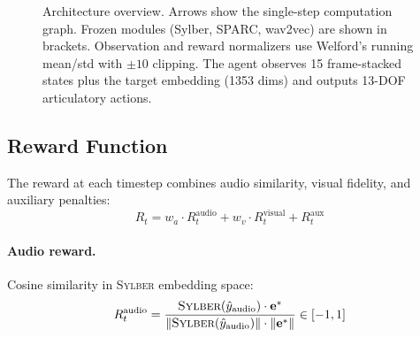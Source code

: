 \documentclass[11pt, a4paper]{article}
\newcommand{\sylber}{\textsc{Sylber}}
\begin{document}
\begin{figure}[t]
\centering
{}
\caption{Architecture overview. Arrows show the single-step computation graph. Frozen modules (Sylber, SPARC, wav2vec) are shown in brackets. Observation and reward normalizers use Welford's running mean/std with $\pm 10$ clipping. The agent observes 15 frame-stacked states plus the target embedding (1353 dims) and outputs 13-DOF articulatory actions.}
\label{fig:architecture}
\end{figure}

\subsection{Reward Function}
\label{sec:reward}

The reward at each timestep combines audio similarity, visual fidelity, and auxiliary penalties:
\begin{equation}
    R_t = w_a \cdot R^{\text{audio}}_t + w_v \cdot R^{\text{visual}}_t + R^{\text{aux}}_t
    \label{eq:reward}
\end{equation}

\paragraph{Audio reward.} Cosine similarity in \sylber{} embedding space:
\begin{equation}
    R^{\text{audio}}_t = \frac{\sylber{}(\hat{y}_{\text{audio}}) \cdot \mathbf{e}^*}{\|\sylber{}(\hat{y}_{\text{audio}})\| \cdot \|\mathbf{e}^*\|} \in [-1, 1]
\end{equation}
\end{document}
